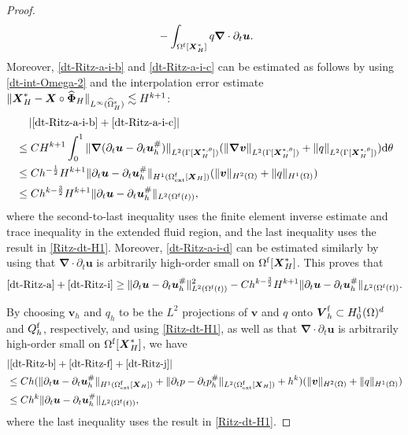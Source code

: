\documentclass[11pt,reqno]{amsart}
\theoremstyle{definition}
\theoremstyle{plain}
\numberwithin{theorem}{section}
\numberwithin{proposition}{section}
\numberwithin{lemma}{section}
\numberwithin{equation}{section}
\newcommand{\bs}[1]{\boldsymbol{#1}}
\newcommand{\uu}[1]  {{\bs{#1}} }
\newcommand{\grad}   { \uu{\nabla}    }
\def\d{\mathrm{d}}
\renewcommand{\(}{\bigl(}
\renewcommand{\)}{\bigr)}
\begin{document}
\begin{proof}
\begin{subequations}
\begin{align}
&\quad\, - \int_{\Omega^{\rm f}[\bs X_H^*]}  q \grad\cdot \partial_t{\bs u} . \label{dt-Ritz-a-i-d}
\end{align}
\end{subequations}
Moreover, \eqref{dt-Ritz-a-i-b} and \eqref{dt-Ritz-a-i-c} can be estimated as follows by using \eqref{dt-int-Omega-2} and the interpolation error estimate $\|{\bs X}_H^*-{\bs X} \circ\widehat{\bs\Phi}_H\|_{L^\infty(\widehat\Omega_H^{\rm s})}\lesssim H^{k+1}$: 
\begin{align*}
&\quad\, |\eqref{dt-Ritz-a-i-b} + \eqref{dt-Ritz-a-i-c}| \\
&\le CH^{k+1}\int_0^1 \|\grad(\partial_t{\bs u}-\partial_t{\bs u}_h^\#)\|_{L^2(\Gamma[\bs X_H^{*,\theta}])}
(\|\grad {\bs v}\|_{L^2(\Gamma[\bs X_H^{*,\theta}])}
+ \|q\|_{L^2(\Gamma[\bs X_H^{*,\theta}])}) \d\theta \\
&\le Ch^{-\frac12}H^{k+1} \|\partial_t{\bs u}-\partial_t{\bs u}_h^\#\|_{H^1(\Omega^{\rm f}_{\rm ext}[\bs X_H])}
(\|{\bs v}\|_{H^2(\Omega)}
+ \|q\|_{H^1(\Omega)}) \\
&\le Ch^{k-\frac32}H^{k+1} \|\partial_t{\bs u}-\partial_t{\bs u}_h^\#\|_{L^2(\Omega^{\rm f}(t))} ,
\end{align*}
where the second-to-last inequality uses the finite element inverse estimate and trace inequality in the extended fluid region, and the last inequality uses the result in \eqref{Ritz-dt-H1}. Moreover, \eqref{dt-Ritz-a-i-d} can be estimated similarly by using that $\grad\cdot \partial_t{\bs u} $ is arbitrarily high-order small on $\Omega^{\rm f}[\bs X_H^*]$. 
This proves that 
\begin{align}
\eqref{dt-Ritz-a} + \eqref{dt-Ritz-i} 
\ge \|\partial_t{\bs u}-\partial_t{\bs u}_h^\#\|_{L^2(\Omega^{\rm f}(t))}^2 - Ch^{k-\frac32}H^{k+1} \|\partial_t{\bs u}-\partial_t{\bs u}_h^\#\|_{L^2(\Omega^{\rm f}(t))} .
\end{align}


By choosing ${\bs v}_h$ and $q_h$ to be the $L^2$ projections of ${\bs v}$ and $q$ onto ${\bs V}_h^{\rm f}\subset H^1_0(\Omega)^d$ and $Q_h^{\rm f}$, respectively, and using \eqref{Ritz-dt-H1}, as well as that $\grad\cdot \partial_t{\bs u} $ is arbitrarily high-order small on $\Omega^{\rm f}[\bs X_H^*]$, we have
\begin{align*}
&| \eqref{dt-Ritz-b} + \eqref{dt-Ritz-f} + \eqref{dt-Ritz-j} | \\
&\le Ch(\|\partial_t{\bs u}-\partial_t{\bs u}_h^\#\|_{H^1(\Omega^{\rm f}_{\rm ext}[\bs X_H])} +\|\partial_tp - \partial_tp_h^\#\|_{L^2(\Omega^{\rm f}_{\rm ext}[\bs X_H])} + h^k) 
( \|{\bs v}\|_{H^2(\Omega)} + \|q\|_{H^1(\Omega)} )\\ 
&\le Ch^k \|\partial_t{\bs u}-\partial_t{\bs u}_h^\#\|_{L^2(\Omega^{\rm f}(t))} ,
\end{align*}
where the last inequality uses the result in \eqref{Ritz-dt-H1}.


\end{proof}
\end{document}
